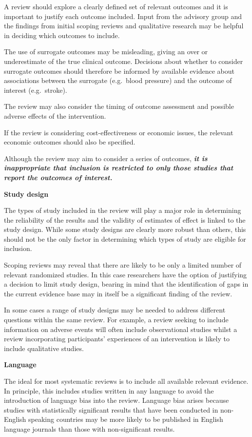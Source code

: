 \documentclass[
  11pt,
  a4paper,
  DIV=11,
  numbers=noendperiod]{scrreprt}
\begin{document}
A review should explore a clearly defined set of relevant outcomes and
it is important to justify each outcome included. Input from the
advisory group and the findings from initial scoping reviews and
qualitative research may be helpful in deciding which outcomes to
include.

The use of surrogate outcomes may be misleading, giving an over or
underestimate of the true clinical outcome. Decisions about whether to
consider surrogate outcomes should therefore be informed by available
evidence about associations between the surrogate (e.g.~blood pressure)
and the outcome of interest (e.g.~stroke).

The review may also consider the timing of outcome assessment and
possible adverse effects of the intervention.

If the review is considering cost-effectiveness or economic issues, the
relevant economic outcomes should also be specified.

Although the review may aim to consider a series of outcomes,
\textbf{\emph{it is inappropriate that inclusion is restricted to only
those studies that report the outcomes of interest.}}

\textbf{Study design}

The types of study included in the review will play a major role in
determining the reliability of the results and the validity of estimates
of effect is linked to the study design. While some study designs are
clearly more robust than others, this should not be the only factor in
determining which types of study are eligible for inclusion.

Scoping reviews may reveal that there are likely to be only a limited
number of relevant randomized studies. In this case researchers have the
option of justifying a decision to limit study design, bearing in mind
that the identification of gaps in the current evidence base may in
itself be a significant finding of the review.

In some cases a range of study designs may be needed to address
different questions within the same review. For example, a review
seeking to include information on adverse events will often include
observational studies whilst a review incorporating participants'
experiences of an intervention is likely to include qualitative studies.

\textbf{Language}

The ideal for most systematic reviews is to include all available
relevant evidence. In principle, this includes studies written in any
language to avoid the introduction of language bias into the review.
Language bias arises because studies with statistically significant
results that have been conducted in non-English speaking countries may
be more likely to be published in English language journals than those
with non-significant results.
\end{document}
